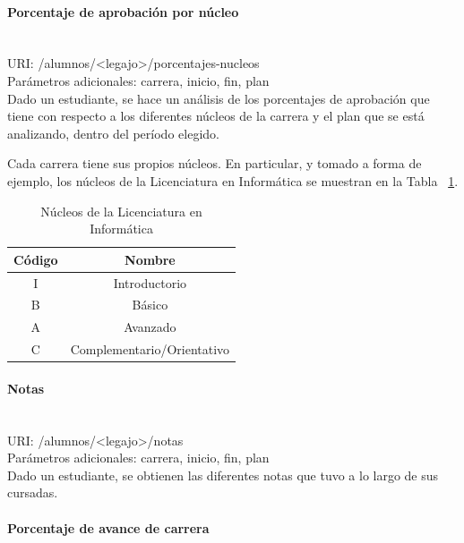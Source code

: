 \paragraph{Porcentaje de aprobación por núcleo}\mbox{}\\

URI: /alumnos/<legajo>/porcentajes-nucleos \\

Parámetros adicionales: carrera, inicio, fin, plan \\

Dado un estudiante, se hace un análisis de los porcentajes de aprobación que tiene con respecto a los diferentes núcleos de la carrera y el plan que se está analizando, dentro del período elegido.

Cada carrera tiene sus propios núcleos. En particular, y tomado a forma de ejemplo, los núcleos de la Licenciatura en Informática se muestran en la Tabla ~\ref{tab:tabla_nucleos}.

\begin{table}[!htbp]
    \centering
    \makegapedcells
    \begin{tabular}{|c|c|}
    \hline
    Código & Nombre \\ \hline
    I & Introductorio \\ \hline
    B & Básico\\ \hline
    A & Avanzado \\ \hline
    C & Complementario/Orientativo \\ \hline
    \end{tabular}
    \caption{Núcleos de la Licenciatura en Informática}
    \label{tab:tabla_nucleos}
\end{table}


\paragraph{Notas}\mbox{}\\

URI: /alumnos/<legajo>/notas \\

Parámetros adicionales: carrera, inicio, fin, plan \\

Dado un estudiante, se obtienen las diferentes notas que tuvo a lo largo de sus cursadas.

\paragraph{Porcentaje de avance de carrera}\mbox{}\\

